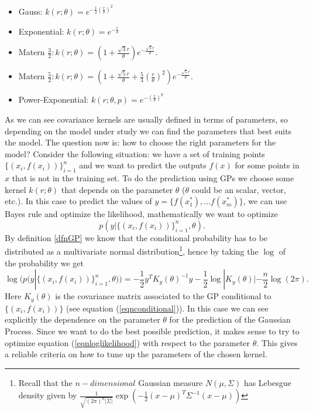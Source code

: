 \documentclass[12pt]{book}
\begin{document}
\begin{itemize}
\item Gauss: $k(r;\theta)=e^{-\frac{1}{2}(\frac{r}{\theta})^{2}}$
\item Exponential: $k(r;\theta)=e^{-\frac{r}{\theta}}$\\
\item Matern $\frac{3}{2}: k(r;\theta)=(1+\frac{\sqrt{3}r}{\theta})e^{-\frac{\sqrt{3}r}{\theta}}$.
\item Matern $\frac{5}{2}: k(r;\theta)=(1+\frac{\sqrt{5}r}{\theta}+\frac{5}{3}
(\frac{r}{\theta})^{2})e^{-\frac{\sqrt{5}r}{\theta}}$.
\item Power-Exponential: $k(r;\theta,p)=e^{-(\frac{r}{\theta})^{p}}$
\end{itemize}

As we can see covariance kernels are usually defined in terms of parameters, so depending on the model
under study we can find the parameters that best suits the model. The question now is: how
to choose the right parameters for the model? Consider the following situation: we have a 
set of training points $\{(x_{i},f(x_{i}))\}_{i=1}^{n}$ and we want to predict the 
outputs $f(x)$ for some points in $x$ that is not in the training set. To do the prediction
using GPs we choose some kernel  $k(r;\theta)$ that depends on the parameter $\theta$ 
($\theta$ could be an scalar, vector, etc.). In this case to predict the values of 
$y=\{f(x_{1}^{*}),\ldots f(x_{m}^{*})\}$, we can use
Bayes rule and optimize the likelihood, mathematically we want to optimize
\begin{equation*}
p(y|\{(x_{i},f(x_{i}))\}_{i=1}^{n},\theta).
\end{equation*}
By definition \ref{dfnGP} we know that the conditional probability has to be distributed as
a multivariate normal distribution\footnote{Recall that the $n-dimensional$ Gaussian measure
$N(\mu,\Sigma)$ has
Lebesgue density given by $\frac{1}{\sqrt{(2\pi)^{n}|\Sigma|}}\exp{\left(-\frac{1}{2}(x-\mu)^{T}\Sigma^{-1}
(x-\mu)\right)}$}, hence by taking the $\log$ of the probability we get
\begin{equation}\label{eqnloglikelihood}
\log(p(y|\{(x_{i},f(x_{i}))\}_{i=1}^{n},\theta))=-\frac{1}{2}y^{T}K_{y}(\theta)^{-1}y-
\frac{1}{2}\log|K_{y}(\theta)|-\frac{n}{2}\log(2\pi).
\end{equation}
Here $K_{y}(\theta)$ is the covariance matrix associated to the GP conditional to  $\{(x_{i},f(x_{i}))\}$ 
(see equation (\ref{eqnconditional})). In this case we can see explicitly the dependence on 
the parameter $\theta$ for the  prediction of the Gaussian Process. Since we want to do 
the best possible prediction, it makes sense to try to optimize equation (\ref{eqnloglikelihood}) 
with respect to the parameter $\theta$. This gives a reliable criteria on how to tune up
the parameters of the chosen kernel. 
\newline
\end{document}
